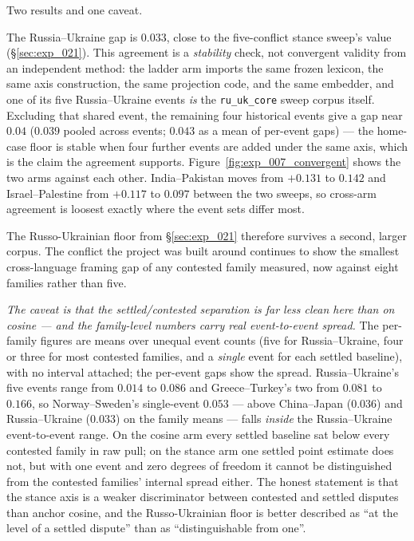 Two results and one caveat.

The Russia--Ukraine gap is $0.033$, close to the five-conflict
stance sweep's value (\S\ref{sec:exp_021}). This agreement is a
\emph{stability} check, not convergent validity from an independent
method: the ladder arm imports the same frozen lexicon, the same
axis construction, the same projection code, and the same embedder,
and one of its five Russia--Ukraine events \emph{is} the
\texttt{ru\_uk\_core} sweep corpus itself. Excluding that shared
event, the remaining four historical events give a gap near
$0.04$ ($0.039$ pooled across events; $0.043$ as a mean of
per-event gaps) --- the home-case floor is stable when four further
events are added under the same axis, which is the claim the
agreement supports.
Figure~\ref{fig:exp_007_convergent} shows the two arms against each
other. India--Pakistan moves from $+0.131$ to $0.142$ and
Israel--Palestine from $+0.117$ to $0.097$ between the two sweeps,
so cross-arm agreement is loosest exactly where the event sets
differ most.

The Russo-Ukrainian floor from \S\ref{sec:exp_021} therefore
survives a second, larger corpus. The conflict the project was built
around continues to show the smallest cross-language framing gap of
any contested family measured, now against eight families rather
than five.

\emph{The caveat is that the settled/contested separation is far
less clean here than on cosine --- and the family-level numbers
carry real event-to-event spread.} The per-family figures are means
over unequal event counts (five for Russia--Ukraine, four or three
for most contested families, and a \emph{single} event for each
settled baseline), with no interval attached; the per-event gaps
show the spread. Russia--Ukraine's five events range from $0.014$
to $0.086$ and Greece--Turkey's two from $0.081$ to $0.166$, so
Norway--Sweden's single-event $0.053$ --- above China--Japan
($0.036$) and Russia--Ukraine ($0.033$) on the family means ---
falls \emph{inside} the Russia--Ukraine event-to-event range. On
the cosine arm every settled baseline sat below every contested
family in raw pull; on the stance arm one settled point estimate
does not, but with one event and zero degrees of freedom it cannot
be distinguished from the contested families' internal spread
either. The honest statement is that the stance axis is a weaker
discriminator between contested and settled disputes than anchor
cosine, and the Russo-Ukrainian floor is better described as ``at
the level of a settled dispute'' than as ``distinguishable from
one''.

